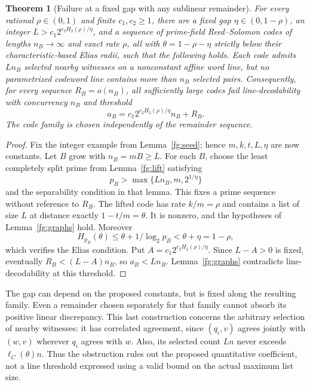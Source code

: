 \documentclass[11pt,letterpaper]{article}
\newtheorem{theorem}{Theorem}[section]
\theoremstyle{definition}
\theoremstyle{remark}
\begin{document}
\begin{theorem}[Failure at a fixed gap with any sublinear remainder]
\label{fg:fixed-gap}
For every rational $\rho\in(0,1)$ and finite $c_1,c_2\ge1$, there are
a fixed gap $\eta\in(0,1-\rho)$, an integer
$L>c_1 2^{c_2H_2(\rho)/\eta}$, and a sequence of prime-field
Reed--Solomon codes of lengths $n_B\to\infty$ and exact rate $\rho$,
all with $\theta=1-\rho-\eta$ strictly below their characteristic-based
Elias radii, such that the following holds.
Each code admits $Ln_B$ selected nearby witnesses on a nonconstant
affine word line, but no parametrized codeword line contains more than
$n_B$ selected pairs. Consequently, for every sequence $R_B=o(n_B)$,
all sufficiently large codes fail line-decodability with concurrency
$n_B$ and threshold
\begin{equation}\label{fg:threshold}
 a_B=c_1 2^{c_2H_2(\rho)/\eta}n_B+R_B.
\end{equation}
The code family is chosen independently of the remainder sequence.
\end{theorem}
\begin{proof}
Fix the integer example from Lemma~\ref{fg:seed}; hence $m,k,t,L,\eta$
are now constants. Let $B$ grow with $n_B=mB\ge L$. For each $B$, choose
the least completely split prime from Lemma~\ref{fg:lift} satisfying
\[
 p_B>\max\{Ln_B,m,2^{1/\eta}\}
\]
and the separability condition in that lemma. This fixes a prime sequence
without reference to $R_B$. The lifted code has rate $k/m=\rho$ and
contains a list of size $L$ at distance exactly $1-t/m=\theta$.
It is nonzero, and the hypotheses of Lemma~\ref{fg:graphs} hold.
Moreover
\[
 H_{p_B}(\theta)\le\theta+1/\log_2p_B
 <\theta+\eta=1-\rho,
\]
which verifies the Elias condition. Put $A=c_1 2^{c_2H_2(\rho)/\eta}$.
Since $L-A>0$ is fixed, eventually $R_B<(L-A)n_B$, so $a_B<Ln_B$.
Lemma~\ref{fg:graphs} contradicts line-decodability at this threshold.
\end{proof}

The gap can depend on the proposed constants, but is fixed along the
resulting family. Even a remainder chosen separately for that family
cannot absorb its positive linear discrepancy.
This last construction concerns the arbitrary selection of nearby
witnesses: it has correlated agreement, since $(q_i,v)$ agrees jointly
with $(w,v)$ wherever $q_i$ agrees with $w$. Also, its selected count
$Ln$ never exceeds $\ell_C(\theta)n$. Thus the obstruction rules out
the proposed quantitative coefficient, not a line threshold expressed
using a valid bound on the actual maximum list size.
\end{document}
